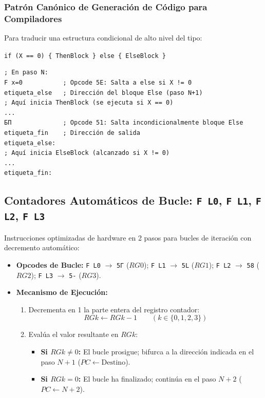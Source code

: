 \documentclass[11pt,a4paper]{article}
\begin{document}
\subsubsection{Patrón Canónico de Generación de Código para Compiladores}
Para traducir una estructura condicional de alto nivel del tipo:
\begin{center}
\texttt{if (X == 0) \{ ThenBlock \} else \{ ElseBlock \}}
\end{center}
\begin{center}
\begin{tcolorbox}[colback=codebg,colframe=darkslate,width=0.95\textwidth]
\begin{verbatim}
; En paso N:
F x=0           ; Opcode 5E: Salta a else si X != 0
etiqueta_else   ; Dirección del bloque Else (paso N+1)
; Aquí inicia ThenBlock (se ejecuta si X == 0)
...
БП              ; Opcode 51: Salta incondicionalmente bloque Else
etiqueta_fin    ; Dirección de salida
etiqueta_else:
; Aquí inicia ElseBlock (alcanzado si X != 0)
...
etiqueta_fin:
\end{verbatim}
\end{tcolorbox}
\end{center}

\subsection{Contadores Automáticos de Bucle: \texttt{F L0}, \texttt{F L1}, \texttt{F L2}, \texttt{F L3}}
Instrucciones optimizadas de hardware en 2 pasos para bucles de iteración con decremento automático:
\begin{itemize}
    \item \textbf{Opcodes de Bucle:}
    \texttt{F L0} $\to$ \texttt{5Г} ($RG0$); \quad
    \texttt{F L1} $\to$ \texttt{5L} ($RG1$); \quad
    \texttt{F L2} $\to$ \texttt{58} ($RG2$); \quad
    \texttt{F L3} $\to$ \texttt{5-} ($RG3$).
    \item \textbf{Mecanismo de Ejecución:}
    \begin{enumerate}
        \item Decrementa en 1 la parte entera del registro contador:
        \[
        RGk \leftarrow RGk - 1 \qquad (k \in \{0, 1, 2, 3\})
        \]
        \item Evalúa el valor resultante en $RGk$:
        \begin{itemize}
            \item \textbf{Si $RGk \ne 0$:} El bucle prosigue; bifurca a la dirección indicada en el paso $N+1$ ($PC \leftarrow \text{Destino}$).
            \item \textbf{Si $RGk = 0$:} El bucle ha finalizado; continúa en el paso $N+2$ ($PC \leftarrow N + 2$).
        \end{itemize}
    \end{enumerate}
\end{itemize}
\end{document}
